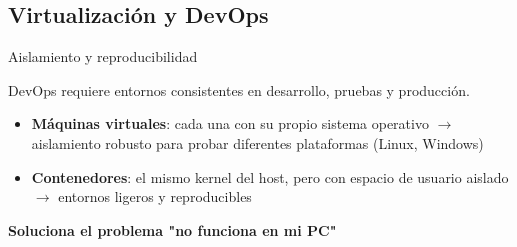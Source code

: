 \documentclass{beamer}
\begin{document}

\subsection{Virtualización y DevOps}

\begin{frame}{Aislamiento y reproducibilidad}

DevOps requiere entornos consistentes en desarrollo, pruebas y producción.

\begin{itemize}
    \item \textbf{Máquinas virtuales}: cada una con su propio sistema operativo $\rightarrow$ aislamiento robusto para probar diferentes plataformas (Linux, Windows)
    \item \textbf{Contenedores}: el mismo kernel del host, pero con espacio de usuario aislado $\rightarrow$ entornos ligeros y reproducibles
\end{itemize}


\begin{tcolorbox}[colback=red!5!white,colframe=red!75!black]
    \textbf{Soluciona el problema "no funciona en mi PC"}
\end{tcolorbox}
    
\end{frame}
\end{document}
